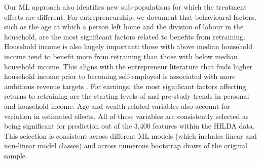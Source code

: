 \documentclass[12pt, a4paper]{article}
\begin{document}
Our ML approach also identifies new sub-populations for which the treatment effects are different. For entrepreneurship, we document that behavioural factors, such as the age at which a person left home and the division of labour in the household, are the most significant factors related to benefits from retraining. Household income is also hugely important: those with above median household income tend to benefit more from retraining than those with below median household income. This aligns with the entrepreneur literature that finds higher household income prior to becoming self-employed is associated with more ambitious revenue targets \citep{cassar2006}. For earnings, the most significant factors affecting returns to retraining are the starting levels of and pre-study trends in personal and household income. Age and wealth-related variables also account for variation in estimated effects. All of these variables are consistently selected as being significant for prediction out of the 3,400 features within the HILDA data. This selection is consistent across different ML models (which includes linear and non-linear model classes) and across numerous bootstrap draws of the original sample. 
\end{document}
